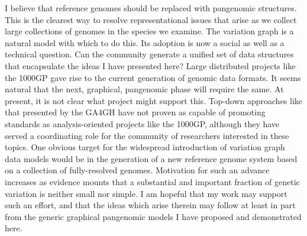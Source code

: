 \documentclass[a4paper,12pt,numbered,oneside]{Classes/PhDThesisPSnPDF}
\begin{document}
I believe that reference genomes should be replaced with pangenomic structures.
This is the clearest way to resolve representational issues that arise as we collect large collections of genomes in the species we examine.
The variation graph is a natural model with which to do this.
Its adoption is now a social as well as a technical question.
Can the community generate a unified set of data structures that encapsulate the ideas I have presented here?
Large distributed projects like the 1000GP gave rise to the current generation of genomic data formats.
It seems natural that the next, graphical, pangenomic phase will require the same.
At present, it is not clear what project might support this.
Top-down approaches like that presented by the GA4GH have not proven as capable of promoting standards as analysis-oriented projects like the 1000GP, although they have served a coordinating role for the community of researchers interested in these topics.
One obvious target for the widespread introduction of variation graph data models would be in the generation of a new reference genome system based on a collection of fully-resolved genomes.
Motivation for such an advance increases as evidence mounts that a substantial and important fraction of genetic variation is neither small nor simple.
I am hopeful that my work may support such an effort, and that the ideas which arise therein may follow at least in part from the generic graphical pangenomic models I have proposed and demonstrated here.

%
%
%



\backmatter

\begin{spacing}{0.9}


%
\cleardoublepage





\end{spacing}
\end{document}
